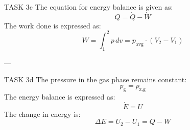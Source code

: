 TASK 3c  
The equation for energy balance is given as:  
\[
Q = \dot{Q} - \dot{W}
\]  
The work done is expressed as:  
\[
\dot{W} = \int_{1}^{2} p \, dv = p_{\text{avg}} \cdot (V_2 - V_1)
\]  

---

TASK 3d  
The pressure in the gas phase remains constant:  
\[
p_{\text{g}} = p_{\text{z,g}}
\]  
The energy balance is expressed as:  
\[
\dot{E} = U
\]  
The change in energy is:  
\[
\Delta E = U_2 - U_1 = Q - W
\]  